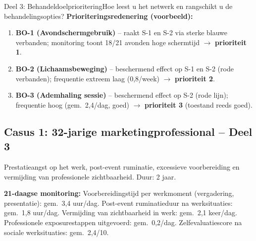 \documentclass[11pt,a4paper]{article}
\begin{document}
\begin{voorbeeldbox}{Deel 3: Behandeldoelprioritering}{Hoe leest u het netwerk en rangschikt u de behandelingsopties?}
\medskip
\textbf{Prioriteringsredenering (voorbeeld):}
\begin{enumerate}[topsep=2pt,itemsep=1pt,label=\arabic*.]
\item \textbf{BO-1 (Avondschermgebruik)} -- raakt S-1 en S-2 via sterke blauwe verbanden;
monitoring toont 18/21 avonden hoge schermtijd $\rightarrow$ \textbf{prioriteit 1}.
\item \textbf{BO-2 (Lichaamsbeweging)} -- beschermend effect op S-1 en S-2 (rode verbanden);
frequentie extreem laag (0,8/week) $\rightarrow$ \textbf{prioriteit 2}.
\item \textbf{BO-3 (Ademhaling sessie)} -- beschermend effect op S-2 (rode lijn);
frequentie hoog (gem.\ 2,4/dag, goed) $\rightarrow$ \textbf{prioriteit 3} (toestand reeds goed).
\end{enumerate}
\end{voorbeeldbox}

\vspace{0.5em}

\newpage
\subsection*{Casus 1: 32-jarige marketingprofessional -- Deel 3}

\begin{complaintbox}[title={Casus 1: 32-jarige marketingprofessional}]
\small Prestatieangst op het werk, post-event ruminatie, excessieve voorbereiding en vermijding van professionele zichtbaarheid. Duur: 2 jaar.
\end{complaintbox}

\begin{monitorbox}
\small\textbf{21-daagse monitoring:} Voorbereidingstijd per werkmoment (vergadering, presentatie): gem.\ 3,4 uur/dag. Post-event ruminatieduur na werksituaties: gem.\ 1,8 uur/dag. Vermijding van zichtbaarheid in werk: gem.\ 2,1 keer/dag. Professionele exposurestappen uitgevoerd: gem.\ 0,2/dag. Zelfevaluatiescore na sociale werksituaties: gem.\ 2,4/10.
\end{monitorbox}
\end{document}
